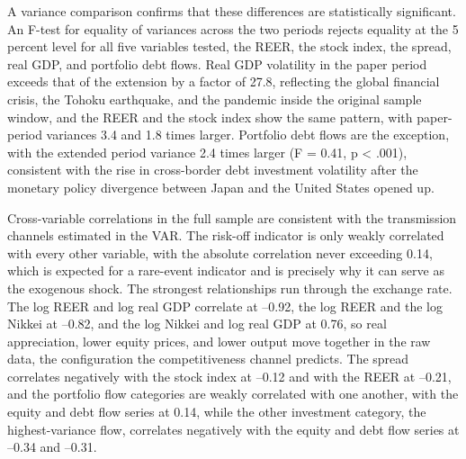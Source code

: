 A variance comparison confirms that these differences are statistically significant. An F-test for equality of variances across the two periods rejects equality at the 5 percent level for all five variables tested, the REER, the stock index, the spread, real GDP, and portfolio debt flows. Real GDP volatility in the paper period exceeds that of the extension by a factor of 27.8, reflecting the global financial crisis, the Tohoku earthquake, and the pandemic inside the original sample window, and the REER and the stock index show the same pattern, with paper-period variances 3.4 and 1.8 times larger. Portfolio debt flows are the exception, with the extended period variance 2.4 times larger (F = 0.41, p < .001), consistent with the rise in cross-border debt investment volatility after the monetary policy divergence between Japan and the United States opened up.

Cross-variable correlations in the full sample are consistent with the transmission channels estimated in the VAR. The risk-off indicator is only weakly correlated with every other variable, with the absolute correlation never exceeding 0.14, which is expected for a rare-event indicator and is precisely why it can serve as the exogenous shock. The strongest relationships run through the exchange rate. The log REER and log real GDP correlate at --0.92, the log REER and the log Nikkei at --0.82, and the log Nikkei and log real GDP at 0.76, so real appreciation, lower equity prices, and lower output move together in the raw data, the configuration the competitiveness channel predicts. The spread correlates negatively with the stock index at --0.12 and with the REER at --0.21, and the portfolio flow categories are weakly correlated with one another, with the equity and debt flow series at 0.14, while the other investment category, the highest-variance flow, correlates negatively with the equity and debt flow series at --0.34 and --0.31.

